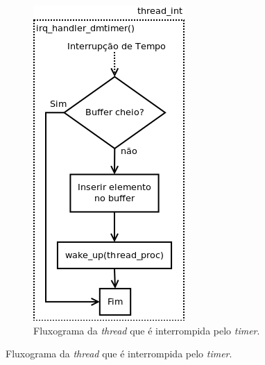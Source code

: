 	\begin{figure}[h!]
	
	\centering
	
		\begin{subfigure}{.33\textwidth}
		  \centering
		  \includegraphics[scale=0.55]{image/thread_int}
		  \caption{\centering Fluxograma da \textit{thread} que é interrompida pelo
		  \textit{timer}.}
		  \label{fig:thread_int}
		  

\end{subfigure}
\end{figure}
